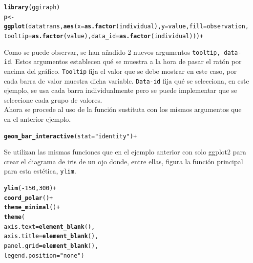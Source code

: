 \documentclass{article}\usepackage[]{graphicx}\usepackage[]{color}
\makeatletter
\newcommand{\hlnum}[1]{\textcolor[rgb]{0.686,0.059,0.569}{#1}}%
\newcommand{\hlstr}[1]{\textcolor[rgb]{0.192,0.494,0.8}{#1}}%
\newcommand{\hlopt}[1]{\textcolor[rgb]{0,0,0}{#1}}%
\newcommand{\hlstd}[1]{\textcolor[rgb]{0.345,0.345,0.345}{#1}}%
\newcommand{\hlkwc}[1]{\textcolor[rgb]{0.333,0.667,0.333}{#1}}%
\newcommand{\hlkwd}[1]{\textcolor[rgb]{0.737,0.353,0.396}{\textbf{#1}}}%
\newenvironment{kframe}{%
 \def\at@end@of@kframe{}%
 \ifinner\ifhmode%
  \def\at@end@of@kframe{\end{minipage}}%
  \begin{minipage}{\columnwidth}%
 \fi\fi%
 \def\FrameCommand##1{\hskip\@totalleftmargin \hskip-\fboxsep
 \colorbox{shadecolor}{##1}\hskip-\fboxsep
     \hskip-\linewidth \hskip-\@totalleftmargin \hskip\columnwidth}%
 \MakeFramed {\advance\hsize-\width
   \@totalleftmargin\z@ \linewidth\hsize
   \@setminipage}}%
 {\par\unskip\endMakeFramed%
 \at@end@of@kframe}
\newenvironment{knitrout}{}{} %
\makeatother
\begin{document}
\begin{knitrout}
\color{fgcolor}\begin{kframe}
\begin{alltt}
\hlkwd{library}(ggiraph)
p <- \hlkwd{ggplot}(datatrans, \hlkwd{aes}(x=\hlkwd{as.factor}(individual), y=value, fill=observation, 
        tooltip= \hlkwd{as.factor}(value), data_id =\hlkwd{as.factor}(individual))) +
\end{alltt}
\end{kframe}
\end{knitrout}
Como se puede observar, se han a\~nadido 2 nuevos argumentos \texttt{tooltip, data-id}. Estos argumentos establecen qu\'e se muestra a la hora de pasar el rat\'on por encima del gr\'afico. \texttt{Tooltip} fija el valor que se debe mostrar en este caso, por cada barra de valor muestra dicha variable. \texttt{Data-id} fija qu\'e se selecciona, en este ejemplo, se usa cada barra individualmente pero se puede implementar que se seleccione cada grupo de valores.~\\
Ahora se procede al uso de la funci\'on sustituta con los mismos argumentos que en el anterior ejemplo.
\begin{knitrout}
\color{fgcolor}\begin{kframe}
\begin{alltt}
        \hlkwd{geom_bar_interactive}(stat=\hlstr{"identity"}) +
\end{alltt}
\end{kframe}
\end{knitrout}
Se utilizan las mismas funciones que en el ejemplo anterior con solo ggplot2 para crear el diagrama de iris de un ojo donde, entre ellas, figura la funci\'on principal para esta est\'etica, \texttt{ylim}.
\begin{knitrout}
\color{fgcolor}\begin{kframe}
\begin{alltt}
        \hlkwd{ylim}\hlstd{(}\hlopt{-}\hlnum{150}\hlstd{,}\hlnum{300}\hlstd{)} \hlopt{+}
        \hlkwd{coord_polar}\hlstd{()} \hlopt{+}
        \hlkwd{theme_minimal}\hlstd{()} \hlopt{+}
        \hlkwd{theme}\hlstd{(}
          \hlkwc{axis.text} \hlstd{=} \hlkwd{element_blank}\hlstd{(),}
          \hlkwc{axis.title} \hlstd{=} \hlkwd{element_blank}\hlstd{(),}
          \hlkwc{panel.grid} \hlstd{=} \hlkwd{element_blank}\hlstd{(),}
          \hlkwc{legend.position} \hlstd{=} \hlstr{"none"}\hlstd{)}
\end{alltt}
\end{kframe}
\end{knitrout}
\end{document}
